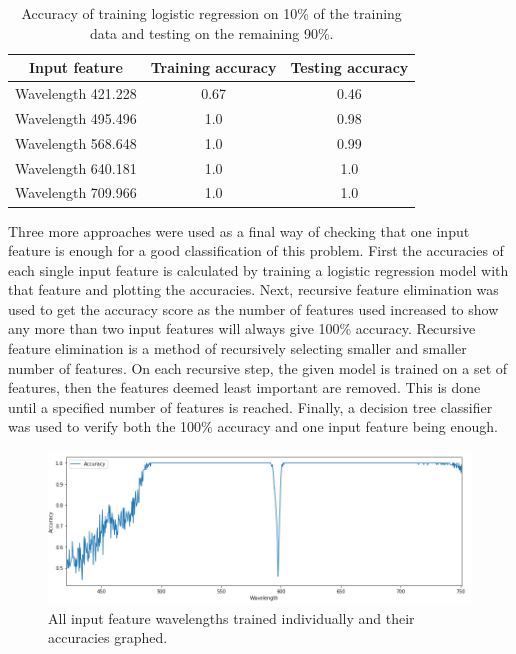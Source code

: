 \documentclass{article}
\begin{document}
\begin{table}[H]
\centering
\begin{tabular}{| c | c | c |}
\hline
\textbf{Input feature} & \textbf{Training accuracy} & \textbf{Testing accuracy}\\
\hline
Wavelength 421.228 & 0.67 & 0.46\\
\hline
Wavelength 495.496 & 1.0 & 0.98\\
\hline
Wavelength 568.648 & 1.0 & 0.99\\
\hline
Wavelength 640.181 & 1.0 & 1.0\\
\hline
Wavelength 709.966 & 1.0 & 1.0\\
\hline
\end{tabular}
\caption{Accuracy of training logistic regression on 10\% of the training data and testing on the remaining 90\%.}
\end{table}
Three more approaches were used as a final way of checking that one input feature is enough for a good classification of this problem. First the accuracies of each single input feature is calculated by training a logistic regression model with that feature and plotting the accuracies. Next, recursive feature elimination was used to get the accuracy score as the number of features used increased to show any more than two input features will always give 100\% accuracy. Recursive feature elimination is a method of recursively selecting smaller and smaller number of features. On each recursive step, the given model is trained on a set of features, then the features deemed least important are removed. This is done until a specified number of features is reached. Finally, a decision tree classifier was used to verify both the 100\% accuracy and one input feature being enough.
\begin{figure}[H]
\centering
\includegraphics[width=1\textwidth]{imgs/binary-accuracy.png}
\caption{All input feature wavelengths trained individually and their accuracies graphed.}
\label{fig:binary-accuracy}
\end{figure}
%
\end{document}
